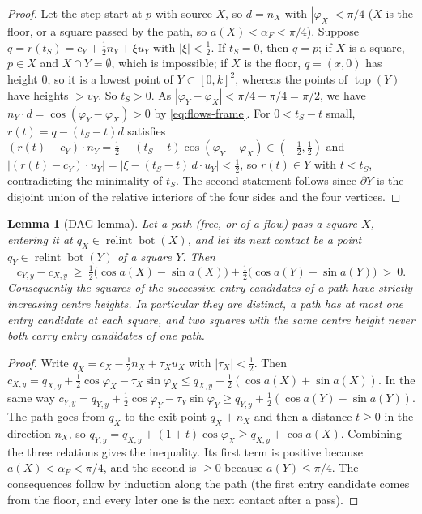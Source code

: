 \documentclass[11pt]{amsart}
\newcommand{\relint}{\operatorname{relint}}
\newcommand{\Bot}{\operatorname{bot}}
\newcommand{\Top}{\operatorname{top}}
\newtheorem{lemma}[theorem]{Lemma}
\theoremstyle{definition}
\theoremstyle{remark}
\numberwithin{equation}{section}
\begin{document}
\begin{proof}
Let the step start at $p$ with source $X$, so $d=n_X$ with $|\varphi_X|<\pi/4$ ($X$ is the floor, or a square passed
by the path, so $a(X)<\alpha_F<\pi/4$). Suppose $q=r(t_S)=c_Y+\frac12n_Y+\xi u_Y$ with $|\xi|<\frac12$. If $t_S=0$, then
$q=p$; if $X$ is a square, $p\in X$ and $X\cap Y=\emptyset$, which is impossible; if $X$ is the floor, $q=(x,0)$ has
height $0$, so it is a lowest point of $Y\subset[0,k]^2$, whereas the points of $\Top(Y)$ have heights $>v_Y$. So
$t_S>0$. As $|\varphi_Y-\varphi_X|<\pi/4+\pi/4=\pi/2$, we have $n_Y\cdot d=\cos(\varphi_Y-\varphi_X)>0$ by
\eqref{eq:flows-frame}. For $0<t_S-t$ small, $r(t)=q-(t_S-t)d$ satisfies
$(r(t)-c_Y)\cdot n_Y=\frac12-(t_S-t)\cos(\varphi_Y-\varphi_X)\in(-\frac12,\frac12)$ and
$|(r(t)-c_Y)\cdot u_Y|=|\xi-(t_S-t)\,d\cdot u_Y|<\frac12$, so $r(t)\in Y$ with $t<t_S$, contradicting the minimality of
$t_S$. The second statement follows since $\partial Y$ is the disjoint union of the relative interiors of the four
sides and the four vertices.
\end{proof}

\begin{lemma}[DAG lemma]\label{lem:DAG}
Let a path (free, or of a flow) pass a square $X$, entering it at $q_X\in\relint\Bot(X)$, and let its next contact be a
point $q_Y\in\relint\Bot(Y)$ of a square $Y$. Then
\[
c_{Y,y}-c_{X,y}\ \ge\ \tfrac12\big(\cos a(X)-\sin a(X)\big)+\tfrac12\big(\cos a(Y)-\sin a(Y)\big)\ >\ 0 .
\]
Consequently the squares of the successive entry candidates of a path have strictly increasing centre heights. In
particular they are distinct, a path has at most one entry candidate at each square, and two squares with the same
centre height never both carry entry candidates of one path.
\end{lemma}

\begin{proof}
Write $q_X=c_X-\frac12n_X+\tau_Xu_X$ with $|\tau_X|<\frac12$. Then
$c_{X,y}=q_{X,y}+\frac12\cos\varphi_X-\tau_X\sin\varphi_X\le q_{X,y}+\frac12(\cos a(X)+\sin a(X))$. In the same way
$c_{Y,y}=q_{Y,y}+\frac12\cos\varphi_Y-\tau_Y\sin\varphi_Y\ge q_{Y,y}+\frac12(\cos a(Y)-\sin a(Y))$. The path goes from
$q_X$ to the exit point $q_X+n_X$ and then a distance $t\ge0$ in the direction $n_X$, so
$q_{Y,y}=q_{X,y}+(1+t)\cos\varphi_X\ge q_{X,y}+\cos a(X)$. Combining the three relations gives the inequality. Its first
term is positive because $a(X)<\alpha_F<\pi/4$, and the second is $\ge0$ because $a(Y)\le\pi/4$. The consequences follow
by induction along the path (the first entry candidate comes from the floor, and every later one is the next contact
after a pass).
\end{proof}
\end{document}
